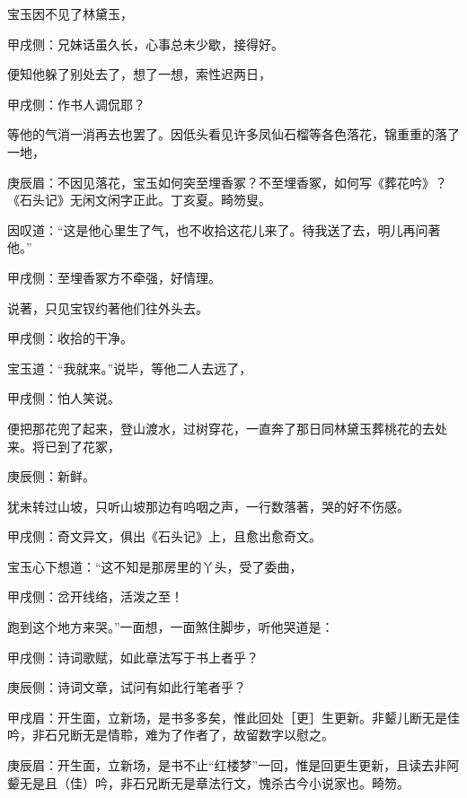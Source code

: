 \begin{parag}
    宝玉因不见了林黛玉，\begin{note}甲戌侧：兄妹话虽久长，心事总未少歇，接得好。\end{note}便知他躲了别处去了，想了一想，索性迟两日，\begin{note}甲戌侧：作书人调侃耶？\end{note}等他的气消一消再去也罢了。因低头看见许多凤仙石榴等各色落花，锦重重的落了一地，\begin{note}庚辰眉：不因见落花，宝玉如何突至埋香冢？不至埋香冢，如何写《葬花吟》？《石头记》无闲文闲字正此。丁亥夏。畸笏叟。\end{note}因叹道：“这是他心里生了气，也不收拾这花儿来了。待我送了去，明儿再问著他。”\begin{note}甲戌侧：至埋香冢方不牵强，好情理。\end{note}说著，只见宝钗约著他们往外头去。\begin{note}甲戌侧：收拾的干净。\end{note}宝玉道：“我就来。”说毕，等他二人去远了，\begin{note}甲戌侧：怕人笑说。\end{note}便把那花兜了起来，登山渡水，过树穿花，一直奔了那日同林黛玉葬桃花的去处来。将已到了花冢，\begin{note}庚辰侧：新鲜。\end{note}犹未转过山坡，只听山坡那边有呜咽之声，一行数落著，哭的好不伤感。\begin{note}甲戌侧：奇文异文，俱出《石头记》上，且愈出愈奇文。\end{note}宝玉心下想道：“这不知是那房里的丫头，受了委曲，\begin{note}甲戌侧：岔开线络，活泼之至！\end{note}跑到这个地方来哭。”一面想，一面煞住脚步，听他哭道是：\begin{note}甲戌侧：诗词歌赋，如此章法写于书上者乎？\end{note}\begin{note}庚辰侧：诗词文章，试问有如此行笔者乎？\end{note}\begin{note}甲戌眉：开生面，立新场，是书多多矣，惟此回处［更］生更新。非颦儿断无是佳吟，非石兄断无是情聆，难为了作者了，故留数字以慰之。\end{note}\begin{note}庚辰眉：开生面，立新场，是书不止“红楼梦”一回，惟是回更生更新，且读去非阿颦无是且（佳）吟，非石兄断无是章法行文，愧杀古今小说家也。畸笏。\end{note}
\end{parag}


